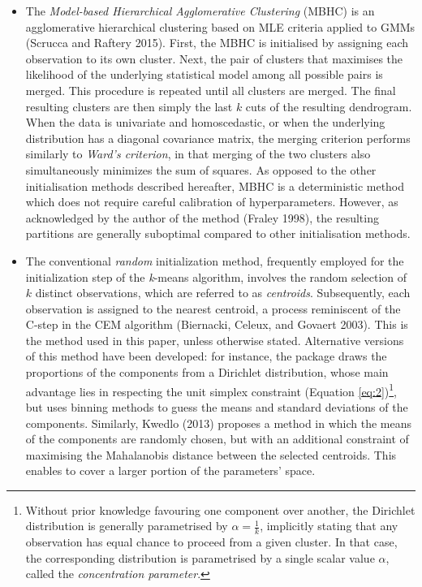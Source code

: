 \begin{itemize}
\item
  The \emph{Model-based Hierarchical Agglomerative Clustering} (MBHC) is
  an agglomerative hierarchical clustering based on MLE criteria applied to
  GMMs (Scrucca and Raftery 2015). First, the MBHC is
  initialised by assigning each observation to its own cluster. Next,
  the pair of clusters that maximises the likelihood of the underlying
  statistical model among all possible pairs is merged. This procedure
  is repeated until all clusters are merged. The final resulting
  clusters are then simply the last \(k\) cuts of the resulting
  dendrogram. When the data is univariate and homoscedastic, or when the underlying distribution has a diagonal covariance matrix, the merging criterion performs similarly to \emph{Ward's criterion}, in that merging of the two clusters also simultaneously minimizes the sum of squares.
  As opposed to the other initialisation methods described hereafter, MBHC is a
  deterministic method which does not require careful calibration of
  hyperparameters. However, as acknowledged by the author of the method (Fraley 1998), the resulting partitions are generally suboptimal compared to other initialisation methods.
\item
  The conventional \emph{random} initialization method, frequently employed for the initialization step of the \emph{k}-means algorithm, involves the random selection of \(k\) distinct observations, which are referred to as \emph{centroids}. Subsequently, each observation is assigned to the nearest centroid, a process reminiscent of the C-step in the CEM algorithm (Biernacki, Celeux, and Govaert 2003). This is the method used in this paper, unless otherwise stated. Alternative versions of this method have been developed: for instance, the package  draws the proportions of the components from a Dirichlet distribution, whose main advantage lies in respecting the unit simplex constraint (Equation \eqref{eq:2})\footnote{Without prior knowledge favouring one component over another, the Dirichlet distribution is generally parametrised by \(\alpha=\frac{1}{k}\), implicitly stating that any observation has equal chance to proceed from a given cluster. In that case, the corresponding distribution is parametrised by a single scalar value \(\alpha\), called the \emph{concentration parameter}.}, but uses binning methods to guess the means and standard deviations of the components. Similarly, Kwedlo (2013) proposes a method in which the means of the components are randomly chosen, but with an additional constraint of maximising the Mahalanobis distance between the selected centroids. This enables to cover a larger portion of the parameters' space.

\end{itemize}
